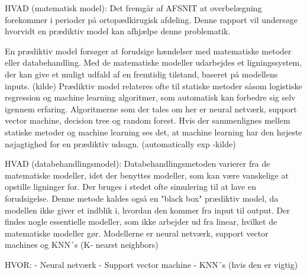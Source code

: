 %
HVAD (matematisk model):
Det fremgår af AFSNIT at overbelægning forekommer i perioder på ortopædkirugisk afdeling. Denne rapport vil undersøge hvorvidt en prædiktiv model kan afhjælpe denne problematik. 

En prædiktiv model forsøger at forudsige hændelser med matematiske metoder eller databehandling. Med de matematiske modeller udarbejdes et ligningssystem, der kan give et muligt udfald af en fremtidig tilstand, baseret på modellens inputs. (kilde) Prædiktiv model relateres ofte til statiske metoder såsom logistiske regression og machine learning algoritmer, som automatisk kan forbedre sig selv igennem erfaring. Algoritmerne som der tales om her er neural netværk, support vector machine, decision tree og random forest. Hvis der sammenlignes mellem statiske metoder og machine learning ses det, at machine learning har den højeste nøjagtighed for en prædiktiv udsagn. (automatically exp -kilde) 





HVAD (databehandlingsmodel):
Databehandlingsmetoden varierer fra de matematiske modeller, idet der benyttes modeller, som kan være vanskelige at opstille ligninger for. Der bruges i stedet ofte simulering til at lave en forudsigelse. Denne metode kaldes også en "black box" prædiktiv model, da modellen ikke giver et indblik i, hvordan den kommer fra input til output. Der findes nogle essentielle modeller, som ikke arbejder ud fra linear, hvilket de matematiske modeller gør. Modellerne er neural netværk, support vector machines og KNN´s (K- nearst neighbors)

HVOR: 
- Neural netværk
- Support vector machine 
- KNN´s (hvis den er vigtig)

